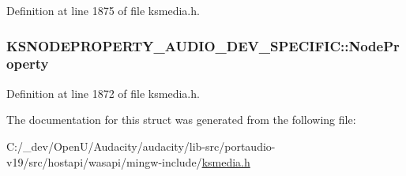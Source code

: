 Definition at line 1875 of file ksmedia.\+h.

\subsubsection[{\texorpdfstring{Node\+Property}{NodeProperty}}]{ K\+S\+N\+O\+D\+E\+P\+R\+O\+P\+E\+R\+T\+Y\+\_\+\+A\+U\+D\+I\+O\+\_\+\+D\+E\+V\+\_\+\+S\+P\+E\+C\+I\+F\+I\+C\+::\+Node\+Property}\hypertarget{struct_k_s_n_o_d_e_p_r_o_p_e_r_t_y___a_u_d_i_o___d_e_v___s_p_e_c_i_f_i_c_adf2e6d75bdd1185c667072f6afe915bb}{}\label{struct_k_s_n_o_d_e_p_r_o_p_e_r_t_y___a_u_d_i_o___d_e_v___s_p_e_c_i_f_i_c_adf2e6d75bdd1185c667072f6afe915bb}


Definition at line 1872 of file ksmedia.\+h.



The documentation for this struct was generated from the following file\+:\begin{DoxyCompactItemize}
\item 
C\+:/\+\_\+dev/\+Open\+U/\+Audacity/audacity/lib-\/src/portaudio-\/v19/src/hostapi/wasapi/mingw-\/include/\hyperlink{ksmedia_8h}{ksmedia.\+h}\end{DoxyCompactItemize}
